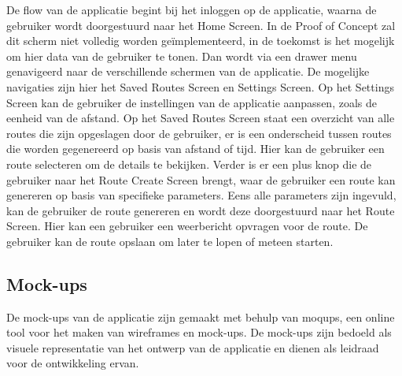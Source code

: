 De flow van de applicatie begint bij het inloggen op de applicatie, waarna de gebruiker wordt doorgestuurd naar het Home Screen. In de Proof of Concept zal dit scherm niet volledig worden geïmplementeerd, in de toekomst is het mogelijk om hier data van de gebruiker te tonen. Dan wordt via een drawer menu genavigeerd naar de verschillende schermen van de applicatie. De mogelijke navigaties zijn hier het Saved Routes Screen en Settings Screen. Op het Settings Screen kan de gebruiker de instellingen van de applicatie aanpassen, zoals de eenheid van de afstand. Op het Saved Routes Screen staat een overzicht van alle routes die zijn opgeslagen door de gebruiker, er is een onderscheid tussen routes die worden gegenereerd op basis van afstand of tijd. Hier kan de gebruiker een route selecteren om de details te bekijken. Verder is er een plus knop die de gebruiker naar het Route Create Screen brengt, waar de gebruiker een route kan genereren op basis van specifieke parameters. Eens alle parameters zijn ingevuld, kan de gebruiker de route genereren en wordt deze doorgestuurd naar het Route Screen. Hier kan een gebruiker een weerbericht opvragen voor de route. De gebruiker kan de route opslaan om later te lopen of meteen starten.

\subsection{Mock-ups}

De mock-ups van de applicatie zijn gemaakt met behulp van moqups, een online tool voor het maken van wireframes en mock-ups. De mock-ups zijn bedoeld als visuele representatie van het ontwerp van de applicatie en dienen als leidraad voor de ontwikkeling ervan.

